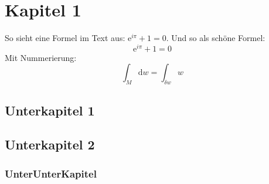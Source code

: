 \section{Kapitel 1}

So sieht eine Formel im Text aus: $\text{e}^{i\pi} + 1 = 0$.
Und so als \glqq schöne\grqq{} Formel:
\[ \text{e}^{i\pi} + 1 = 0 \]
Mit Nummerierung:
\begin{equation}
    \int_M \text{d} w = \int_{\delta w} w
\end{equation}

\subsection{Unterkapitel 1}

\subsection{Unterkapitel 2}

\subsubsection{UnterUnterKapitel}